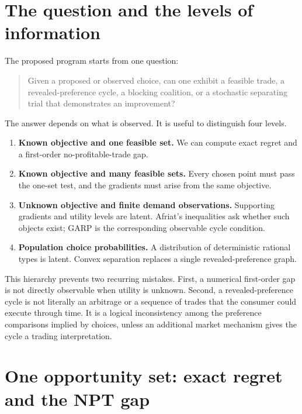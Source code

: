 \documentclass[11pt]{article}
\theoremstyle{definition}
\theoremstyle{remark}
\begin{document}
\tableofcontents

\section{The question and the levels of information}

The proposed program starts from one question:

\begin{quote}
Given a proposed or observed choice, can one exhibit a feasible trade, a revealed-preference
cycle, a blocking coalition, or a stochastic separating trial that demonstrates an improvement?
\end{quote}

The answer depends on what is observed.  It is useful to distinguish four levels.

\begin{enumerate}[label=\textbf{L\arabic*.}]
  \item \textbf{Known objective and one feasible set.}  We can compute exact regret and a
  first-order no-profitable-trade gap.
  \item \textbf{Known objective and many feasible sets.}  Every chosen point must pass the
  one-set test, and the gradients must arise from the same objective.
  \item \textbf{Unknown objective and finite demand observations.}  Supporting gradients and
  utility levels are latent.  Afriat's inequalities ask whether such objects exist; GARP is the
  corresponding observable cycle condition.
  \item \textbf{Population choice probabilities.}  A distribution of deterministic rational
  types is latent.  Convex separation replaces a single revealed-preference graph.
\end{enumerate}

This hierarchy prevents two recurring mistakes.  First, a numerical first-order gap is not
directly observable when utility is unknown.  Second, a revealed-preference cycle is not literally
an arbitrage or a sequence of trades that the consumer could execute through time.  It is a
logical inconsistency among the preference comparisons implied by choices, unless an additional
market mechanism gives the cycle a trading interpretation.

\section{One opportunity set: exact regret and the NPT gap}
\end{document}

